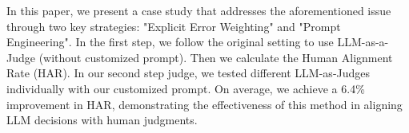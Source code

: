 


In this paper, we present a case study that addresses the aforementioned issue through two key strategies: "Explicit Error Weighting" and "Prompt Engineering". In the first step, we follow the original setting to use LLM-as-a-Judge (without customized prompt). Then we calculate the Human Alignment Rate (HAR). 
In our second step judge, we tested different LLM-as-Judges individually with our customized prompt. On average, we achieve a 6.4\% improvement in HAR, demonstrating the effectiveness of this method in aligning LLM decisions with human judgments.















